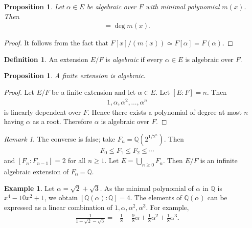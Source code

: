 \documentclass[12pt]{report}
\theoremstyle{plain}
\newtheorem{proposition}[theorem]{Proposition}
\theoremstyle{remark}
\newtheorem*{remark}{Remark}
\theoremstyle{definition}
\newtheorem{definition}[theorem]{Definition}
\newtheorem{example}[theorem]{Example}
\newcommand{\Q}{\mathbb{Q}}
\begin{document}
\clearpage
\begin{proposition}
    Let $\alpha\in E$ be algebraic over $F$ with minimal polynomial $m(x)$. Then
    \begin{align*}
        [F(\alpha):F]=\deg m(x).
    \end{align*}
\end{proposition}
\begin{proof}
    It follows from the fact that $F[x]/(m(x))\simeq F[\alpha]=F(\alpha)$.
\end{proof}

\begin{definition}
    An extension $E/F$ is \emph{algebraic} if every $\alpha\in E$ is algebraic over $F$.
\end{definition}

\begin{proposition}
    A finite extension is algebraic.
\end{proposition}
\begin{proof}
    Let $E/F$ be a finite extension and let $\alpha\in E$. Let $[E:F]=n$. Then
    \begin{align*}
        1,\alpha,\alpha^2,\dots,\alpha^n
    \end{align*}
    is linearly dependent over $F$. Hence there exists a polynomial of degree at most $n$ having $\alpha$ as a root. Therefore $\alpha$ is algebraic over $F$.
\end{proof}
\begin{remark}
    The converse is false; take $F_n=\Q(2^{1/2^n})$. Then
    \begin{align*}
        F_0\le F_1\le F_2\le \cdots
    \end{align*}
    and $[F_n:F_{n-1}]=2$ for all $n\ge 1$. Let $E=\bigcup_{n\ge 0}F_n$. Then $E/F$ is an infinite algebraic extension of $F_0=\Q$. 
\end{remark}

\begin{example}
    Let $\alpha=\sqrt{2}+\sqrt{3}$. As the minimal polynomial of $\alpha$ in $\Q$ is $x^4-10x^2+1$, we obtain $[\Q(\alpha):\Q]=4$. The elements of $\Q(\alpha)$ can be expressed as a linear combination of $1,\alpha,\alpha^2,\alpha^3$. For example,
    \begin{align*}
        \frac{1}{1+\sqrt{2}-\sqrt{3}}= -\frac{1}{8}-\frac{9}{8}\alpha+\frac{1}{8}\alpha^2+\frac{1}{8}\alpha^3.
    \end{align*}
\end{example}
\end{document}
